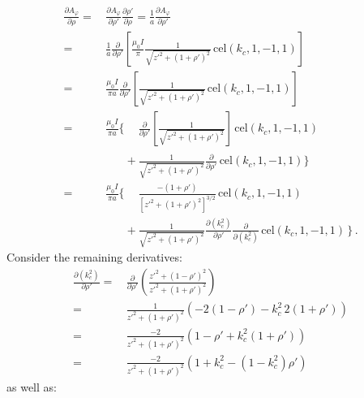 \begin{align}
      \frac{\partial A_\varphi}{\partial \rho}
 =&\, \frac{\partial A_\varphi}{\partial \rho'} \frac{\partial \rho'}{\partial \rho}
 =    \frac{1}{a} \frac{\partial A_\varphi}{\partial \rho'} \nonumber \\
 =&\, \frac{1}{a} \frac{\partial}{\partial \rho'} \left[
                               \frac{\mu_0 I}{\pi}
                               \frac{1}{\sqrt{z'^2 + (1 + \rho')^2}}
                               \,\mathrm{cel}(k_c, 1, -1, 1) \right] \nonumber \\
 =&\, \frac{\mu_0 I}{\pi a} \frac{\partial}{\partial \rho'} \left[
        \frac{1}{\sqrt{z'^2 + (1 + \rho')^2}} \,\mathrm{cel}(k_c, 1, -1, 1) \right] \nonumber \\
 =&\,          \frac{\mu_0 I}{\pi a} \Biggl\{ \phantom{+}
        \frac{\partial}{\partial \rho'} \left[ \frac{1}{\sqrt{z'^2 + (1 + \rho')^2}} \right] \,\mathrm{cel}(k_c, 1, -1, 1) \nonumber \\
 ~&\, \phantom{\frac{\mu_0 I}{\pi a} \Biggl\{}         +
        \frac{1}{\sqrt{z'^2 + (1 + \rho')^2}} \frac{\partial}{\partial \rho'} \,\mathrm{cel}(k_c, 1, -1, 1) \Biggr\} \nonumber \\
 =&\,          \frac{\mu_0 I}{\pi a} \Biggl\{ \phantom{+}
        \frac{-(1+\rho')}{\left[z'^2 + (1 + \rho')^2\right]^{3/2}}\,\mathrm{cel}(k_c, 1, -1, 1) \nonumber \\
 ~&\, \phantom{\frac{\mu_0 I}{\pi a} \Biggl\{}         +
        \frac{1}{\sqrt{z'^2 + (1 + \rho')^2}} \frac{\partial (k_c^2)}{\partial \rho'}
        \frac{\partial}{\partial (k_c^2)} \,\mathrm{cel}(k_c, 1, -1, 1)\, \Biggr\} \label{eqn:dAphiDrho} \, .
\end{align}
Consider the remaining derivatives:
\begin{align}
      \frac{\partial (k_c^2)}{\partial \rho'}
 =&\, \frac{\partial}{\partial \rho'} \left( \frac{z'^2 + (1 - \rho')^2}{z'^2 + (1 + \rho')^2} \right) \nonumber \\
 =&\, \frac{1}{z'^2 + (1 + \rho')^2} \left(-2(1 - \rho') - k_c^2 \, 2 (1 + \rho') \right) \nonumber \\
 =&\, \frac{-2}{z'^2 + (1 + \rho')^2} \left(1 - \rho' + k_c^2 (1 + \rho') \right) \nonumber \\
 =&\, \frac{-2}{z'^2 + (1 + \rho')^2} \left(1 + k_c^2 - (1 - k_c^2) \rho' \right)
\end{align}
as well as:
